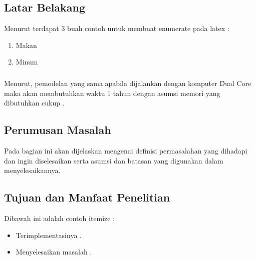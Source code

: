 \chapter{\babSatu}


\section{Latar Belakang}

Menurut terdapat 3 buah contoh untuk membuat enumerate pada latex : 
\begin{enumerate}
\item Makan
\item Minum
\end{enumerate}\paragraph{}

Menurut, pemodelan yang sama apabila dijalankan dengan komputer \f{Dual Core} maka akan membutuhkan waktu 1 tahun dengan asumsi memori yang dibutuhkan cukup .

\section{Perumusan Masalah}
Pada bagian ini akan dijelaskan mengenai definisi permasalahan yang dihadapi dan ingin diselesaikan serta asumsi dan batasan yang digunakan dalam menyelesaikannya.

\section{Tujuan dan Manfaat Penelitian}
Dibawah ini adalah contoh itemize : 
\begin{itemize}
\item Terimplementasinya .
\item Menyelesaikan masalah .
\end{itemize}
